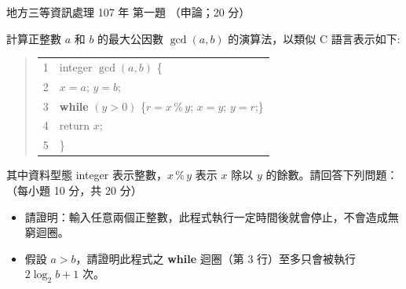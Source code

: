 \begin{pastexam}[label={px:df3-107-ds-01}]{地方三等資訊處理 107 年 第一題}
（申論；20 分）

計算正整數 $a$ 和 $b$ 的最大公因數 $\gcd(a, b)$ 的演算法，以類似 C 語言表示如下:
\begin{quote}
\begin{tabular}{@{}r@{\qquad}l@{}}
1 & integer $\gcd(a, b)$ \{ \\
2 & \qquad $x = a$; $y = b$; \\
3 & \qquad \textbf{while} $(y > 0)$ \{$r = x \mathbin{\%} y$; $x = y$; $y = r$;\} \\
4 & \qquad return $x$; \\
5 & \}
\end{tabular}
\end{quote}
其中資料型態 integer 表示整數，$x \mathbin{\%} y$ 表示 $x$ 除以 $y$ 的餘數。請回答下列問題：（每小題 10 分，共 20 分）
\begin{itemize}[leftmargin=2.2em]
\item[㈠] 請證明：輸入任意兩個正整數，此程式執行一定時間後就會停止，不會造成無窮迴圈。
\item[㈡] 假設 $a > b$，請證明此程式之 \textbf{while} 迴圈（第 3 行）至多只會被執行 $2\log_2 b + 1$ 次。
\end{itemize}
\end{pastexam}

